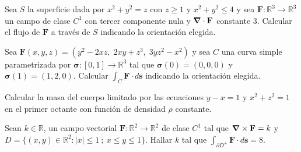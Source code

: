 
\begin{question}
    Sea  $S$  la superficie dada por $x^{2}+ y^{2} = z$ con $z \geq 1$  y $x^{2}+ y^{2} \leq 4$  y sea  $\mathbf{F}:\mathbb{R}^{3}\rightarrow\mathbb{R}^{3}$  un campo de clase $C^{1}$ con tercer componente  nula y $\grad \cdot \mathbf{F}$ constante 3. Calcular el flujo de  $\mathbf{F}$  a trav\'es de $S$ indicando la orientaci\'on elegida.
\end{question}


\begin{question}
    Sea $\mathbf{F}(x,y,z) = (y^{2}-2xz,\;2xy+z^{3},\;3yz^{2}-x^{2}) $ y sea  $C$ una curva simple parametrizada por $\boldsymbol{\sigma}:[0,1]\rightarrow \mathbb{R}^{3}$
    tal que $\boldsymbol{\sigma}(0)=(0,0,0)$ y $\boldsymbol{\sigma}(1)=(1,2,0)$. Calcular $\int_{C} \mathbf{F}\cdot d\mathbf{s}$ indicando la orientaci\'on elegida.
\end{question}


\begin{question}
    Calcular la masa del cuerpo limitado por las ecuaciones $y-x=1$ y $x^{2}+ z^{2} = 1$ en el primer octante con funci\'on de densidad $\rho$ constante.
\end{question}


\begin{question}
    Sean  $k\in\mathbb{R}$,  un campo vectorial $\mathbf{F}:\mathbb{R}^{2}\rightarrow\mathbb{R}^{2}$   de clase $C^{1}$ tal que $\grad\times \mathbf{F}=k$ y $D=\{ (x,y) \in \mathbb{R}^{2} :  |x| \leq 1 \:  ; \:   x \leq y\leq 1  \}.$ Hallar $k$ tal que $\int_{\partial D^{+}}\mathbf{F}\cdot d\mathbf{s} = 8$.
\end{question}

